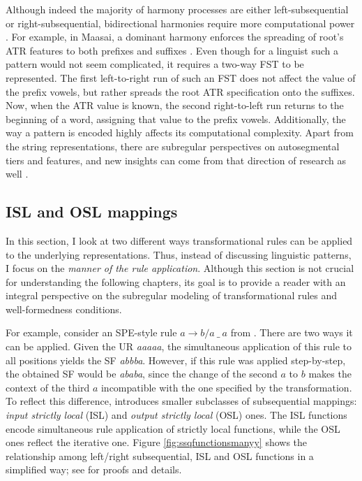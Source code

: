 Although indeed the majority of harmony processes are either left-subsequential or right-subsequential, bidirectional harmonies require more computational power \citep{Heinz-Lai-2013-VHS}.
For example, in Maasai, a dominant harmony enforces the spreading of root's ATR features to both prefixes and suffixes \citep{RoseWalker2011}.
Even though for a linguist such a pattern would not seem complicated, it requires a two-way FST to be represented.
The first left-to-right run of such an FST does not affect the value of the prefix vowels, but rather spreads the root ATR specification onto the suffixes.
Now, when the ATR value is known, the second right-to-left run returns to the beginning of a word, assigning that value to the prefix vowels.
Additionally, the way a pattern is encoded highly affects its computational complexity. 
Apart from the string representations, there are subregular perspectives on autosegmental tiers and features, and new insights can come from that direction of research as well \citep{chandlee-etal-2019-learning,chandlee-jardine-2019-autosegmental}.




\subsection{ISL and OSL mappings}
\label{ISLandOSLmaps}

In this section, I look at two different ways transformational rules can be applied to the underlying representations.
Thus, instead of discussing linguistic patterns, I focus on the \emph{manner of the rule application}.
Although this section is not crucial for understanding the following chapters, its goal is to provide a reader with an integral perspective on the subregular modeling of transformational rules and well-formedness conditions.


For example, consider an SPE-style rule $a \rightarrow b / a~ \_~ a$ from \citep{Chandlee2014}.
There are two ways it can be applied.
Given the UR \emph{aaaaa}, the simultaneous application of this rule to all positions yields the SF \emph{abbba}.
However, if this rule was applied step-by-step, the obtained SF would be \emph{ababa}, since the change of the second $a$ to $b$ makes the context of the third $a$ incompatible with the one specified by the transformation.
To reflect this difference, \cite{Chandlee2014} introduces smaller subclasses of subsequential mappings: \emph{input strictly local} (ISL) and \emph{output strictly local} (OSL) ones.
The ISL functions encode simultaneous rule application of strictly local functions, while the OSL ones reflect the iterative one.
Figure \ref{fig:ssqfunctionsmanyy} shows the relationship among left/right subsequential, ISL and OSL functions in a simplified way; see \cite{ChandleeEtAl2014,ChandleeEtAl2015} for proofs and details.


